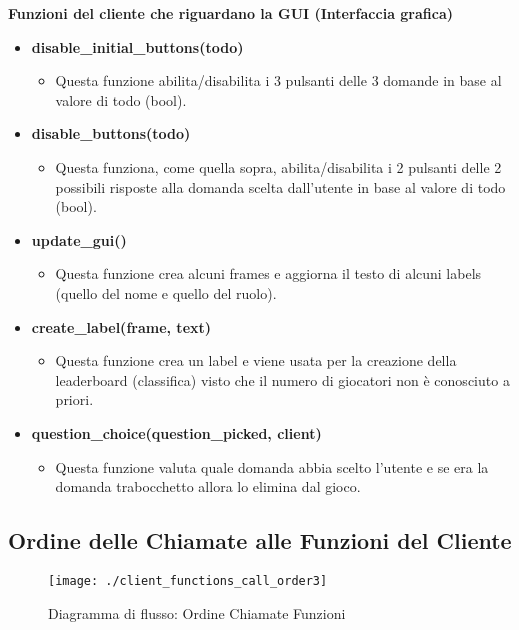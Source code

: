 \textbf{\large Funzioni del cliente che riguardano la GUI (Interfaccia grafica)}
\begin{itemize}
	\item \textbf{\normalsize disable\_initial\_buttons(todo)}
	\begin{itemize}
		\item \textsf{\normalsize Questa funzione abilita/disabilita i 3 pulsanti delle 3 domande in base al valore di todo (bool).}
	\end{itemize}
	\item \textbf{\normalsize disable\_buttons(todo)}
	\begin{itemize}
		\item \textsf{\normalsize Questa funziona, come quella sopra, abilita/disabilita i 2 pulsanti delle 2 possibili risposte alla domanda scelta dall'utente in base al valore di todo (bool).}
	\end{itemize}
	\item \textbf{\normalsize update\_gui()}
	\begin{itemize}
		\item \textsf{\normalsize Questa funzione crea alcuni frames e aggiorna il testo di alcuni labels (quello del nome e quello del ruolo).}
	\end{itemize}
	\item \textbf{\normalsize create\_label(frame, text)}
	\begin{itemize}
		\item \textsf{\normalsize Questa funzione crea un label e viene usata per la creazione della leaderboard (classifica) visto che il numero di giocatori non è conosciuto a priori.}
	\end{itemize}
	\item \textbf{\normalsize question\_choice(question\_picked, client)}
	\begin{itemize}
		\item \textsf{\normalsize Questa funzione valuta quale domanda abbia scelto l'utente e se era la domanda trabocchetto allora lo elimina dal gioco.}
	\end{itemize}
\end{itemize}

\newpage

\subsection{Ordine delle Chiamate alle Funzioni del Cliente}
\begin{figure}[ht] %
	\centering
	\texttt{[image: ./client\_functions\_call\_order3]}
	\caption{Diagramma di flusso: Ordine Chiamate Funzioni}
	\label{fig:client_functions_call_order}
\end{figure}

